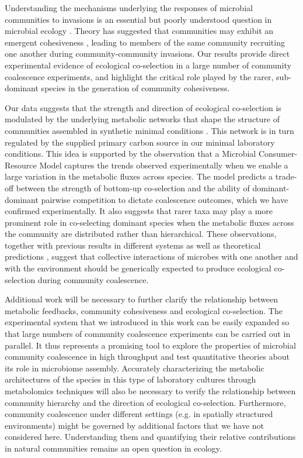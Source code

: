 \documentclass[a4paper,10pt]{article}
\begin{document}
Understanding the mechanisms underlying the responses of microbial communities to invasions is
an essential but poorly understood question in microbial ecology \cite{Rillig2015}.
Theory has suggested that communities may exhibit an emergent cohesiveness
\cite{Gilpin1994,Livingston2013,Tikhonov2016,Tikhonov2017},
leading to members of the same community recruiting one another during
community-community invasions.
Our results provide direct experimental evidence of ecological co-selection in a large number
of community coalescence experiments,
and highlight the critical role played by the rarer, sub-dominant species in the generation
of community cohesiveness.

Our data suggests that the strength and direction of ecological co-selection is modulated
by the underlying metabolic networks that shape the structure of
communities assembled in synthetic minimal conditions
\cite{Goldford2018,Estrela2020}.
This network is in turn regulated by the supplied primary carbon source
in our minimal laboratory conditions.
This idea is supported by the observation that a Microbial Consumer-Resource Model
captures the trends observed experimentally when we enable a large variation
in the metabolic fluxes across species.
The model predicts a trade-off between the strength of bottom-up co-selection
and the ability of dominant-dominant pairwise competition to dictate coalescence outcomes,
which we have confirmed experimentally.
It also suggests that rarer taxa may play a more prominent role in co-selecting
dominant species when the metabolic fluxes across the community are
distributed rather than hierarchical.
These observations,
together with previous results in different systems \cite{Sierocinski2017} as well as
theoretical predictions
\cite{Gilpin1994,Toquenaga1997,Tikhonov2016,Tikhonov2017,Vila2019,Lechon2021},
suggest that collective interactions of microbes with one another
and with the environment should be generically expected to produce ecological co-selection
during community coalescence.

Additional work will be necessary to further clarify the relationship between
metabolic feedbacks, community cohesiveness and ecological co-selection.
The experimental system that we introduced in this work can be easily expanded so that
large numbers of community coalescence experiments can be carried out in parallel.
It thus represents a promising tool to explore the properties of microbial community
coalescence in high throughput
and test quantitative theories about its role in microbiome assembly.
Accurately characterizing the metabolic architectures of the species in
this type of laboratory cultures through metabolomics techniques
will also be necessary to verify the relationship between community hierarchy
and the direction of ecological co-selection.
Furthermore, community coalescence under different settings
(e.g. in spatially structured environments)
might be governed by additional factors that we have not considered here.
Understanding them and quantifying their relative contributions in natural communities
remains an open question in ecology.
\end{document}
